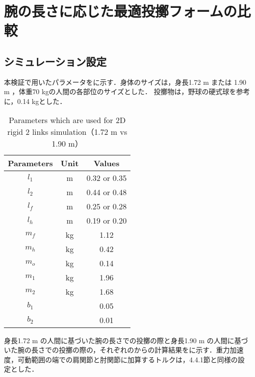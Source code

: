 \section{腕の長さに応じた最適投擲フォームの比較}
\subsection{シミュレーション設定}
本検証で用いたパラメータをに示す．身体のサイズは，身長1.72 m または 1.90 m ，体重70 kgの人間の各部位のサイズとした．
投擲物は，野球の硬式球を参考に，0.14 kgとした．
\begin{table}[tb]
  \begin{center}
    \caption{Parameters which are used for 2D rigid 2 links simulation（1.72 m vs 1.90 m）}
    \begin{tabular}{c|c|c}
      \hline
      Parameters & Unit & Values \\
      \hline
      $l_{1}$ & m & 0.32 or 0.35 \\
      $l_{2}$ & m & 0.44 or 0.48 \\
      $l_{f}$ & m & 0.25 or 0.28 \\
      $l_{h}$ & m & 0.19 or 0.20 \\
      $m_{f}$ & kg & 1.12 \\
      $m_{h}$ & kg & 0.42 \\
      $m_{o}$ & kg & 0.14 \\
      $m_{1}$ & kg & 1.96 \\
      $m_{2}$ & kg & 1.68 \\
      $b_{1}$ &  & 0.05 \\
      $b_{2}$ &  & 0.01 \\
      \hline
    \end{tabular}
  \end{center}
\end{table}


身長1.72 m の人間に基づいた腕の長さでの投擲の際と身長1.90 m の人間に基づいた腕の長さでの投擲の際の，それぞれのからの計算結果をに示す．重力加速度，可動範囲の端での肩関節と肘関節に加算するトルクは，4.4.1節と同様の設定とした．

